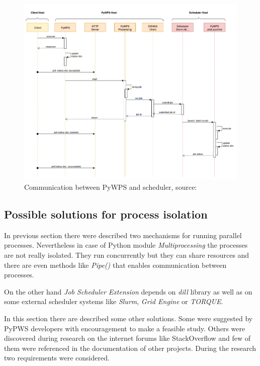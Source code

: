 \begin{figure}[h!]
\centering
\includegraphics[width=\textwidth]{img/Isolation_interaction.png}
\caption{Communication between PyWPS and scheduler, source: \cite{PyWPS_docs}}
\label{fig:Isolation_interaction}
\end{figure}

\subsection{Possible solutions for process isolation}
In previous section there were described two mechanisms for running parallel processes. Nevertheless in case of Python module
\textit{Multiprocessing} the processes are not really isolated. They run concurrently but they can share resources and there are 
even methods like \textit{Pipe()} that enables communication between processes.

On the other hand \textit{Job Scheduler Extension} depends on
\textit{dill} library as well as on some external scheduler systems
like \textit{Slurm}, \textit{Grid Engine} or \textit{TORQUE}.

\bigskip In this section there are described some other
solutions. Some were suggested by PyPWS developers with
encouragement to make a feasible study. Others were discovered
during research on the internet forums like StackOverflow and few of
them were referenced in the documentation of other projects. During
the research two requirements were considered.

